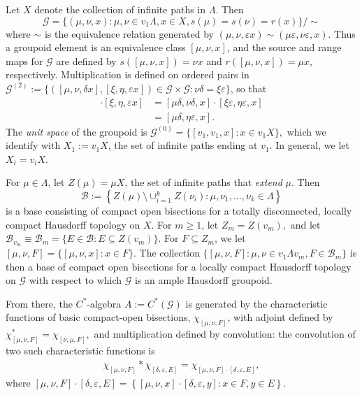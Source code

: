 \documentclass[12pt]{amsart}
\newcommand{\sse}{\subseteq}
\newcommand{\mc}[1]{\mathcal{#1}}
\newcommand{\ep}{\varepsilon}
\newcommand{\La}{\Lambda}
\theoremstyle{plain} %
\theoremstyle{definition} %
\begin{document}
Let $X$ denote the collection of infinite paths in $\Lambda$. Then $$\mc{G} = \{ (\mu, \nu, x) : \mu, \nu \in v_1 \Lambda, x \in X, s(\mu) = s(\nu) = r(x) \} / \sim $$ where $\sim$ is the equivalence relation generated by $(\mu, \nu, \ep x) \sim (\mu \ep, \nu \ep, x)$. Thus a groupoid element is an equivalence class $[\mu, \nu, x]$, and the source and range maps for $\mc{G}$ are defined by $s([\mu, \nu, x]) = \nu x$ and $r([\mu, \nu, x]) = \mu x$, respectively. Multiplication is defined on ordered pairs in $\mc{G}^{(2)} := \{([\mu, \nu, \delta x], [\xi, \eta, \ep x]) \in \mc{G} \times \mc{G}: \nu \delta = \xi \ep\}$, so that \begin{align*}
    [\mu, \nu, \delta x] \cdot [\xi, \eta, \ep x] &= [\mu\delta, \nu \delta, x] \cdot [\xi \ep, \eta \ep, x]\\
    &= [\mu\delta, \eta \ep, x].
\end{align*}
The \textit{unit space} of the groupoid is $\mc{G}^{(0)} = \{[v_1, v_1, x] : x \in v_1 X\},$ which we identify with $X_1 := v_1 X$, the set of infinite paths ending at $v_1$. In general, we let $X_i = v_i X$.

For $\mu \in \Lambda$, let $Z(\mu) = \mu X$, the set of infinite paths that \textit{extend} $\mu$. Then 
\begin{equation}\label{compact-open-bis}
    \mc{B} := \left\{ Z(\mu) \setminus \cup_{i=1}^k Z(\nu_i) : \mu, \nu_1, \dots, \nu_k \in \Lambda\right\}
\end{equation} 
is a base consisting of compact open bisections for a totally disconnected, locally compact Hausdorff topology on $X$. For $m \ge 1$, let $Z_m = Z(v_m),$ and let $\mc{B}_{v_m} \equiv \mc{B}_{m} = \{E \in \mc{B} : E \sse Z(v_m)\}$.
For $F \subseteq Z_m$, we let $[\mu, \nu, F] = \{[\mu, \nu, x] : x \in F\}$. The collection $\{ [\mu, \nu, F] : \mu, \nu \in v_1 \La v_m, F \in \mc{B}_m \}$ is then a base of compact open bisections for a locally compact Hausdorff topology on $\mc{G}$ with respect to which $\mc{G}$ is an ample Hausdorff groupoid.

From there, the $C^*$-algebra $A := C^*(\mc{G})$ is generated by the characteristic functions of basic compact-open bisections, $\chi_{[\mu, \nu, F]}$, with adjoint defined by $\chi_{[\mu,\nu,F]}^* = \chi_{[\nu, \mu, F]},$ and multiplication defined by convolution:  the convolution of two such characteristic functions is \begin{align*}
    \chi_{[\mu, \nu, F]} * \chi_{[\delta, \ep, E]} = \chi_{[\mu, \nu, F] \cdot [\delta, \ep, E]},
\end{align*}
where $[\mu, \nu, F] \cdot [\delta, \ep, E] = \left\{[\mu, \nu, x] \cdot [\delta, \ep, y] : x \in F, y \in E\right\}$.
\end{document}
